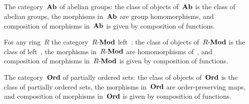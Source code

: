 \subsection{}

The category~$\mathbf{Ab}$ of abelian groups:
the class of objects of~$\mathbf{Ab}$ is the class of abelian groups, the morphisms in~$\mathbf{Ab}$ are group homomorphisms, and composition of morphisms in~$\mathbf{Ab}$ is given by composition of functions.

For any ring~$R$ the category~$R\text{-}\mathbf{Mod}$ left~:
the class of objects of~$R\text{-}\mathbf{Mod}$ is the class of left~, the morphisms in~$R\text{-}\mathbf{Mod}$ are homomorphisms of~, and composition of morphisms in~$R\text{-}\mathbf{Mod}$ is given by composition of functions.

The category~$\mathbf{Ord}$ of partially ordered sets:
the class of objects of~$\mathbf{Ord}$ is the class of partially ordered sets, the morphisms in~$\mathbf{Ord}$ are order-preserving maps, and composition of morphisms in~$\mathbf{Ord}$ is given by composition of functions.


